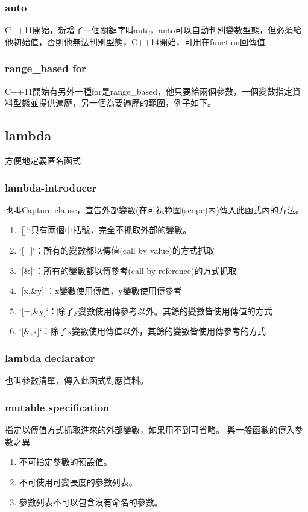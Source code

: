 \subsubsection{auto}
C++11開始，新增了一個關鍵字叫auto，auto可以自動判別變數型態，但必須給他初始值，否則他無法判別型態，C++14開始，可用在function回傳值

\subsubsection{range\_based for}
C++11開始有另外一種for是range\_based，他只要給兩個參數，一個變數指定資料型態並提供遍歷，另一個為要遍歷的範圍，例子如下。

\subsection{lambda}
方便地定義匿名函式
\subsubsection{lambda-introducer}
也叫Capture clause，宣告外部變數(在可視範圍(scope)內)傳入此函式內的方法。
\begin{enumerate}
\item `[]`:只有兩個中括號，完全不抓取外部的變數。
\item `[=]`：所有的變數都以傳值(call by value)的方式抓取
\item `[\&]`：所有的變數都以傳參考(call by reference)的方式抓取
\item `[x,\&y]`：x變數使用傳值，y變數使用傳參考
\item `[=,\&y]`：除了y變數使用傳參考以外。其餘的變數皆使用傳值的方式
\item `[\&,x]`：除了x變數使用傳值以外，其餘的變數皆使用傳參考的方式
\end{enumerate}
\subsubsection{lambda declarator}
也叫參數清單，傳入此函式對應資料。
\subsubsection{mutable specification}
指定以傳值方式抓取進來的外部變數，如果用不到可省略。
與一般函數的傳入參數之異
\begin{enumerate}
\item 不可指定參數的預設值。
\item 不可使用可變長度的參數列表。
\item 參數列表不可以包含沒有命名的參數。
\end{enumerate}
